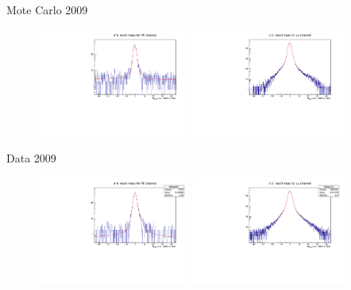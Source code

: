 \documentclass[unicode]{beamer}
\begin{document}
\begin{frame}
	\begin{block}{\small Mote Carlo 2009}
\begin{figure}
	\includegraphics[width=0.45\textwidth]{fig/MrecKK09.pdf} \hfill
	\includegraphics[width=0.45\textwidth]{fig/MrecUU09.pdf} \hfill
\end{figure}
\end{block}
	\begin{block}{\small Data 2009}
\begin{figure}
	\includegraphics[width=0.45\textwidth]{fig/data09-MrecKK.pdf} \hfill
	\includegraphics[width=0.45\textwidth]{fig/data09-MrecUU.pdf} \hfill
\end{figure}
\end{block}
\end{frame}
\end{document}
